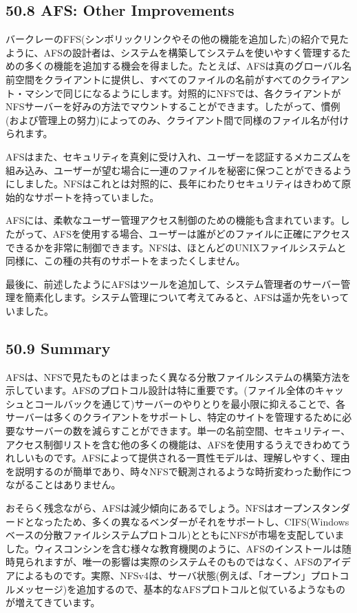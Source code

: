 \hypertarget{afs-other-improvements}{%
\subsection*{50.8 AFS: Other Improvements}\label{afs-other-improvements}}

バークレーのFFS(シンボリックリンクやその他の機能を追加した)の紹介で見たように、AFSの設計者は、システムを構築してシステムを使いやすく管理するための多くの機能を追加する機会を得ました。たとえば、AFSは真のグローバル名前空間をクライアントに提供し、すべてのファイルの名前がすべてのクライアント・マシンで同じになるようにします。対照的にNFSでは、各クライアントがNFSサーバーを好みの方法でマウントすることができます。したがって、慣例(および管理上の努力)によってのみ、クライアント間で同様のファイル名が付けられます。

AFSはまた、セキュリティを真剣に受け入れ、ユーザーを認証するメカニズムを組み込み、ユーザーが望む場合に一連のファイルを秘密に保つことができるようにしました。NFSはこれとは対照的に、長年にわたりセキュリティはきわめて原始的なサポートを持っていました。

AFSには、柔軟なユーザー管理アクセス制御のための機能も含まれています。したがって、AFSを使用する場合、ユーザーは誰がどのファイルに正確にアクセスできるかを非常に制御できます。NFSは、ほとんどのUNIXファイルシステムと同様に、この種の共有のサポートをまったくしません。

最後に、前述したようにAFSはツールを追加して、システム管理者のサーバー管理を簡素化します。システム管理について考えてみると、AFSは遥か先をいっていました。

\hypertarget{summary-36}{%
\subsection*{50.9 Summary}\label{summary-36}}

AFSは、NFSで見たものとはまったく異なる分散ファイルシステムの構築方法を示しています。AFSのプロトコル設計は特に重要です。(ファイル全体のキャッシュとコールバックを通じて)サーバーのやりとりを最小限に抑えることで、各サーバーは多くのクライアントをサポートし、特定のサイトを管理するために必要なサーバーの数を減らすことができます。単一の名前空間、セキュリティー、アクセス制御リストを含む他の多くの機能は、AFSを使用するうえできわめてうれしいものです。AFSによって提供される一貫性モデルは、理解しやすく、理由を説明するのが簡単であり、時々NFSで観測されるような時折変わった動作につながることはありません。

おそらく残念ながら、AFSは減少傾向にあるでしょう。NFSはオープンスタンダードとなったため、多くの異なるベンダーがそれをサポートし、CIFS(Windowsベースの分散ファイルシステムプロトコル)とともにNFSが市場を支配していました。ウィスコンシンを含む様々な教育機関のように、AFSのインストールは随時見られますが、唯一の影響は実際のシステムそのものではなく、AFSのアイデアによるものです。実際、NFSv4は、サーバ状態(例えば、「オープン」プロトコルメッセージ)を追加するので、基本的なAFSプロトコルと似ているようなものが増えてきています。

